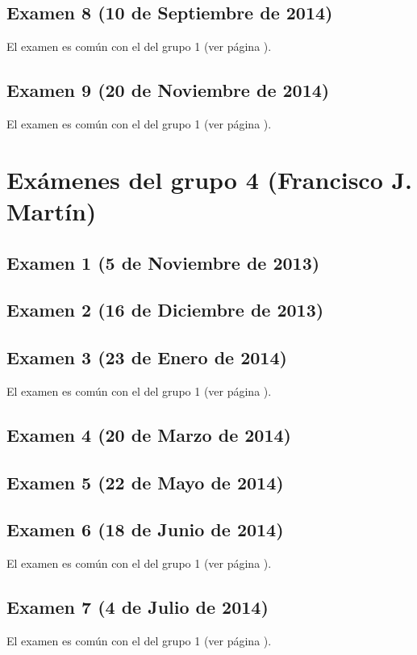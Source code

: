 \documentclass[a4paper,12pt,twoside]{book}
\begin{document}
\subsection{Examen 8 (10 de Septiembre de 2014)}
El examen es común con el del grupo 1 (ver página \pageref{examen_13_14_3_8}).
\subsection{Examen 9 (20 de Noviembre de 2014)}
El examen es común con el del grupo 1 (ver página \pageref{examen_13_14_3_9}).

\section{Exámenes del grupo 4 (Francisco J. Martín)}
\subsection{Examen 1 (5 de Noviembre de 2013)}
\subsection{Examen 2 (16 de Diciembre de 2013)}
\subsection{Examen 3 (23 de Enero de 2014)}
El examen es común con el del grupo 1 (ver página \pageref{examen_13_14_1_3}).
\subsection{Examen 4 (20 de Marzo de 2014)}
\subsection{Examen 5 (22 de Mayo de 2014)}
\subsection{Examen 6 (18 de Junio de 2014)}
El examen es común con el del grupo 1 (ver página \pageref{examen_13_14_1_6}).
\subsection{Examen 7 (4 de Julio de 2014)}
El examen es común con el del grupo 1 (ver página \pageref{examen_13_14_3_7}).
\end{document}
